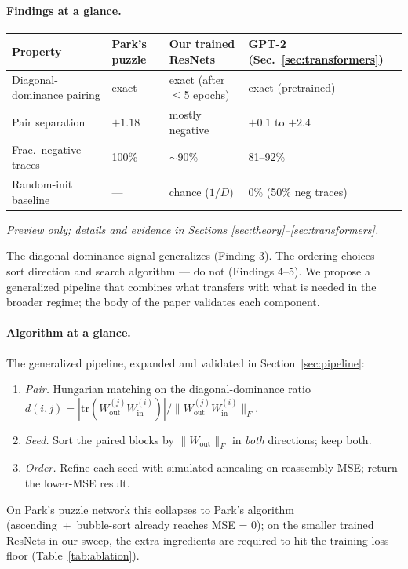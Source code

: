 \documentclass[10pt]{article}
\theoremstyle{remark}
\begin{document}
\paragraph{Findings at a glance.}

\begin{center}
\renewcommand{\arraystretch}{1.15}
\begin{tabular}{llll}
\toprule
Property & Park's puzzle & Our trained ResNets & GPT-2 (Sec.~\ref{sec:transformers}) \\
\midrule
Diagonal-dominance pairing & exact & exact (after $\leq$5 epochs) & exact (pretrained) \\
Pair separation & $+1.18$ & mostly negative & $+0.1$ to $+2.4$ \\
Frac.\ negative traces & 100\% & $\sim$90\% & 81--92\% \\
Random-init baseline & --- & chance ($1/D$) & 0\% (50\% neg traces) \\
\bottomrule
\end{tabular}
\end{center}
\noindent\textit{\small Preview only; details and evidence in Sections \ref{sec:theory}--\ref{sec:transformers}.}

The diagonal-dominance signal generalizes (Finding 3). The
ordering choices --- sort direction and search algorithm --- do not
(Findings 4--5). We propose a generalized pipeline that combines what
transfers with what is needed in the broader regime; the body of the
paper validates each component.

\paragraph{Algorithm at a glance.} The generalized pipeline, expanded
and validated in Section~\ref{sec:pipeline}:
\begin{enumerate}[leftmargin=*,itemsep=0pt,topsep=2pt]
  \item \emph{Pair.} Hungarian matching on the diagonal-dominance ratio
        $d(i,j)=|\mathrm{tr}(W_{\mathrm{out}}^{(j)} W_{\mathrm{in}}^{(i)})|/
        \|W_{\mathrm{out}}^{(j)} W_{\mathrm{in}}^{(i)}\|_F$.
  \item \emph{Seed.} Sort the paired blocks by $\|W_{\mathrm{out}}\|_F$
        in \emph{both} directions; keep both.
  \item \emph{Order.} Refine each seed with simulated annealing on
        reassembly MSE; return the lower-MSE result.
\end{enumerate}
On Park's puzzle network this collapses to Park's algorithm
(ascending~+~bubble-sort already reaches MSE = 0); on the smaller
trained ResNets in our sweep, the extra ingredients are required to
hit the training-loss floor (Table~\ref{tab:ablation}).
\end{document}
